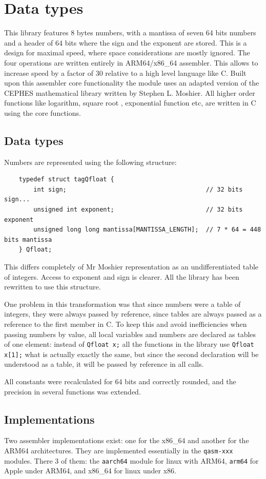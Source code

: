 \documentclass[10pt,a4paper,x11names]{memoir} %
\begin{document}
\chapter{Data types}
This library features 8 bytes numbers, with a mantissa of seven 64 bits numbers and a header of 64 bits where the sign and the exponent are stored. This is a design for maximal speed, where space considerations are mostly ignored. The four operations are written entirely in ARM64/x86\_64 assembler. This allows to increase speed by a factor of 30 relative to a high level language like C. Built upon this assembler core functionality the module uses an adapted version of the CEPHES mathematical library written by Stephen L. Moshier. All higher order functions like logarithm, square root , exponential function etc, are written in C using the core functions.
\section{Data types}
Numbers are represented using the following structure:
\begin{lstlisting}
	typedef struct tagQfloat {
		int sign;                                      // 32 bits sign...
		unsigned int exponent;                         // 32 bits exponent
		unsigned long long mantissa[MANTISSA_LENGTH];  // 7 * 64 = 448 bits mantissa
	} Qfloat;
\end{lstlisting}

This differs completely of Mr Moshier representation as an undifferentiated table of integers. Access to exponent
and sign is clearer. All the library has been rewritten to use this structure. 

One problem in this transformation was that since numbers were a table of integers, they were always passed by reference, since tables are always passed as a reference to the first member in C. To keep this and avoid inefficiencies when passing numbers by value, all local variables and numbers are declared as tables of one element: instead of \verb,Qfloat x;, all the functions in the library use \verb,Qfloat x[1];, what is actually exactly the same, but since the second declaration will be understood as a table, it will be passed by reference in all calls.

All constants were recalculated for 64 bits and correctly rounded, and the precision in several functions was extended.
\section{Implementations}
Two assembler implementations exist: one for the x86\_64 and another for the ARM64 architectures. They are implemented essentially in the \verb,qasm-xxx, modules. There 3 of them: the \verb,aarch64, module for linux with ARM64, \verb,arm64, for Apple under ARM64, and x86\_64 for linux  under x86.
\end{document}
